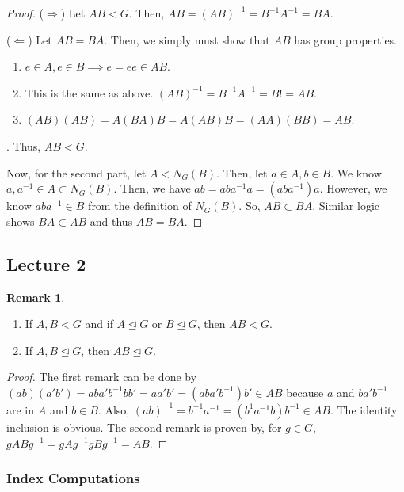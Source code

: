 \documentclass[11pt,leqno,oneside]{amsart}
\newcommand{\subgroup}{\mathrel{<}}
\newcommand{\normsubgroup}{\mathrel{\unlhd}}
\theoremstyle{definition}
\newtheorem{rmk}[thm]{Remark}
\numberwithin{equation}{section}
\begin{document}
    \begin{proof}
        ($\Rightarrow$) Let $AB \subgroup G$. Then, $AB = (AB)^{-1} =
        B^{-1}A^{-1} = BA$.

        ($\Leftarrow$) Let $AB = BA$. Then, we simply must show that $AB$ has
        group properties.\begin{enumerate}
            \item $e \in A, e \in B \implies e = ee \in AB$.
            \item This is the same as above. $(AB)^{-1} = B^{-1}A^{-1} = B! = AB$.
            \item $(AB)(AB) = A(BA)B = A(AB)B = (AA)(BB) = AB$.
        \end{enumerate}. Thus, $AB \subgroup G$.

        Now, for the second part, let $A \subgroup N_G(B)$. Then, let $a \in A,
        b \in B$. We know $a,a^{-1} \in A \subset N_G(B)$. Then, we have $ab =
        aba^{-1}a = (aba^{-1})a$. However, we know $aba^{-1} \in B$ from the
        definition of $N_G(B)$. So, $AB \subset BA$. Similar logic shows $BA
        \subset AB$ and thus $AB = BA$.
    \end{proof}

    \subsection*{Lecture 2}
    \begin{rmk}
        \begin{enumerate}
            \item If $A,B \subgroup G$ and if $A \normsubgroup G$ or $B \normsubgroup G$, then $AB \subgroup G$.
            \item If $A,B \normsubgroup G$, then $AB \normsubgroup G$.
        \end{enumerate}
    \end{rmk}
    \begin{proof}
        The first remark can be done by $(ab)(a'b') = aba'b^{-1}bb' = aa'b' = (aba'b^{-1})b' \in AB$ because $a$ and $ba'b^{-1}$ are in $A$ and $b \in B$. Also, $(ab)^{-1} = b^{-1}a^{-1} = (b^{1}a^{-1}b)b^{-1} \in AB$. The identity inclusion is obvious.
        The second remark is proven by, for $g \in G$, $gABg^{-1} = gAg^{-1}gBg^{-1} = AB$.
    \end{proof}

    \subsubsection*{Index Computations}
\end{document}
